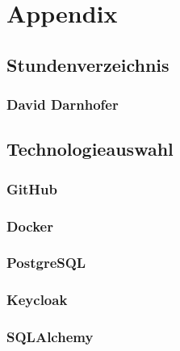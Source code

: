 
\section{Appendix}

\subsection{Stundenverzeichnis}

\subsubsection{David Darnhofer}

\subsection{Technologieauswahl}

\subsubsection{GitHub}

\subsubsection{Docker}

\subsubsection{PostgreSQL}

\subsubsection{Keycloak}

\subsubsection{SQLAlchemy}

